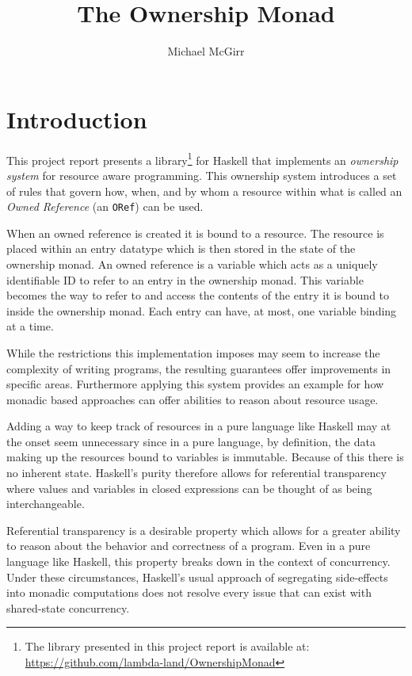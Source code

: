 \documentclass[onehalf,11pt]{beavtex}
\title{The Ownership Monad}
\author{Michael McGirr}
\begin{document}
\maketitle

\mainmatter

\chapter{Introduction}

This project report presents a
library\footnote{
  The library presented in this project report is available at:
  \href{https://github.com/lambda-land/OwnershipMonad}{https://github.com/lambda-land/OwnershipMonad}
}
for Haskell that implements an
\textit{ownership system} for resource aware programming. This ownership system
introduces a set of rules that govern how, when, and by whom a resource within
what is called an \textit{Owned Reference} (an \texttt{ORef}) can be used.

When an owned reference is created it is bound to a resource.
The resource is placed within an entry datatype which is then stored in the
state of the ownership monad.
An owned reference is a variable which acts as a uniquely identifiable ID to
refer to an entry in the ownership monad.
This variable becomes the way to refer to and access the contents of the
entry it is bound to inside the ownership monad.
Each entry can have, at most, one variable binding at a time.

While the restrictions this implementation imposes may seem to increase the
complexity of writing programs, the resulting guarantees offer improvements in
specific areas.
Furthermore applying this system provides an example for how monadic based
approaches can offer abilities to reason about resource usage.

Adding a way to keep track of resources in a pure language like Haskell may
at the onset seem unnecessary since in a pure language, by definition,
the data making up the resources bound to variables is immutable.
Because of this there is no inherent state.  Haskell's purity therefore allows
for referential transparency where values and variables in closed expressions
can be thought of as being interchangeable.

Referential transparency is a desirable property which allows for a greater
ability to reason about the behavior and correctness of a program.
Even in a pure language like Haskell, this property breaks down in the context
of concurrency.
Under these circumstances, Haskell's usual approach of segregating side-effects
into monadic computations does not resolve every issue that can exist with
shared-state concurrency.
\end{document}
